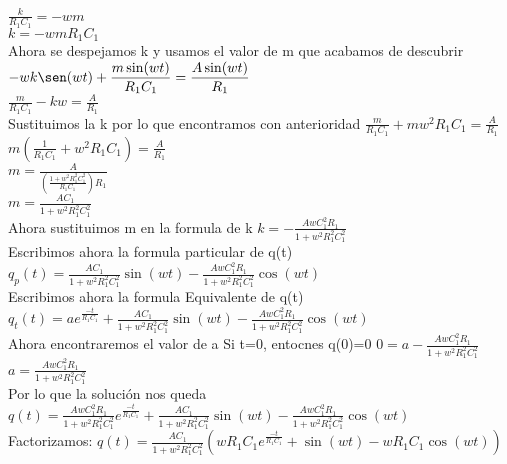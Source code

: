\documentclass[12pt]{article}
\newcommand{\e}[1]{e^{#1}}
\newcommand{\escribir}[1]{\singlespacing#1\singlespacing}
\newcommand{\fraccion}[2]{\displaystyle{\frac{#1}{#2}}}
\begin{document}
	$\fraccion{k}{R_1C_1}=-wm$\\

	$k=-wmR_1C_1$\\ 

	\escribir{Ahora se despejamos k y usamos el valor de m que acabamos de descubrir}
	$-wk\sen(wt)+\fraccion{m\sin(wt)}{R_1C_1}=\fraccion{A\sin(wt)}{R_1}$\\

	$\fraccion{m}{R_1C_1}-kw=\fraccion{A}{R_1}$\\
	\escribir{Sustituimos la k por lo que encontramos con anterioridad}
	$\fraccion{m}{R_1C_1}+mw^2R_1C_1=\fraccion{A}{R_1}$\\

	$m(\fraccion{1}{R_1C_1}+w^2R_1C_1)=\fraccion{A}{R_1}$\\

	$m=\fraccion{A}{(\fraccion{1+w^2R_1^2C_1^2}{R_1C_1})R_1}$\\

	$m=\fraccion{AC_1}{1+w^2R_1^2C_1^2}$\\
	
	\escribir{Ahora sustituimos m en la formula de k}
	$k=-\fraccion{AwC_1^2R_1}{1+w^2R_1^2C_1^2}$\\

	\escribir{Escribimos ahora la formula particular de q(t)}
	$q_p(t)=\fraccion{AC_1}{1+w^2R_1^2C_1^2}\sin(wt)-\fraccion{AwC_1^2R_1}{1+w^2R_1^2C_1^2}\cos(wt)$\\

	\escribir{Escribimos ahora la formula Equivalente de q(t)}
	$q_t(t)=a\e{\frac{-t}{R_1C_1}}+\fraccion{AC_1}{1+w^2R_1^2C_1^2}\sin(wt)-\fraccion{AwC_1^2R_1}{1+w^2R_1^2C_1^2}\cos(wt)$\\
	
	\escribir{Ahora encontraremos el valor de a}
	\escribir{Si t=0, entocnes q(0)=0}
	$0=a-\fraccion{AwC_1^2R_1}{1+w^2R_1^2C_1^2}$\\
	
	$a=\fraccion{AwC_1^2R_1}{1+w^2R_1^2C_1^2}$\\

	\escribir{Por lo que la solución nos queda}
	$q(t)=\fraccion{AwC_1^2R_1}{1+w^2R_1^2C_1^2}\e{\frac{-t}{R_1C_1}}+\fraccion{AC_1}{1+w^2R_1^2C_1^2}\sin(wt)-\fraccion{AwC_1^2R_1}{1+w^2R_1^2C_1^2}\cos(wt)$\\

	\escribir{Factorizamos:}
	$q(t)=\fraccion{AC_1}{1+w^2R_1^2C_1^2}(wR_1C_1\e{\frac{-t}{R_1C_1}}+\sin(wt)-wR_1C_1\cos(wt))$\\
\end{document}
